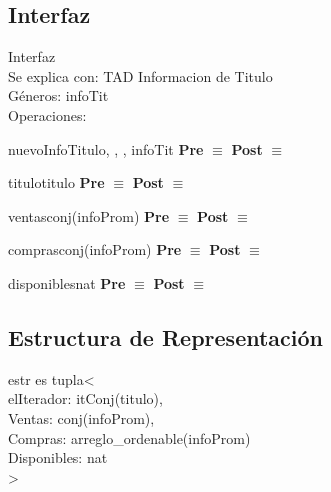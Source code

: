 \subsection{Interfaz}
	\noindent Interfaz \\
	Se explica con: TAD Informacion de Titulo\\
	G\'{e}neros: infoTit\\
	Operaciones:
	
	
	\begin{interfaz}{nuevoInfoTitulo}{, , , }{infoTit}{}
	\textbf{Pre} $\equiv$
	\textbf{Post} $\equiv$
	\end{interfaz}
	
	\begin{interfaz}{titulo}{}{titulo}{}
	\textbf{Pre} $\equiv$
	\textbf{Post} $\equiv$
	\end{interfaz}
	
	\begin{interfaz}{ventas}{}{conj(infoProm)}{}
	\textbf{Pre} $\equiv$
	\textbf{Post} $\equiv$
	\end{interfaz}
	
	\begin{interfaz}{compras}{}{conj(infoProm)}{}
	\textbf{Pre} $\equiv$
	\textbf{Post} $\equiv$
	\end{interfaz}
	
	\begin{interfaz}{disponibles}{}{nat}{}
	\textbf{Pre} $\equiv$
	\textbf{Post} $\equiv$
	\end{interfaz}
	
\subsection{Estructura de Representaci\'on}

estr es	tupla< \\
			elIterador: itConj(titulo), \\
			Ventas:		conj(infoProm),  \\
			Compras:	arreglo\_ordenable(infoProm)  \\
			Disponibles: nat \\
			> \\

